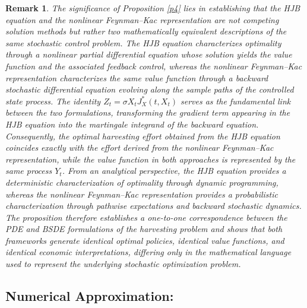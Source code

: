\documentclass[11pt]{article}
\newtheorem{remark}{\bf Remark}
\begin{document}
	\begin{remark}
		The significance of Proposition \ref{p4} lies in establishing that the HJB equation and the nonlinear Feynman--Kac representation are not competing solution methods but rather two mathematically equivalent descriptions of the same stochastic control problem. The HJB equation characterizes optimality through a nonlinear partial differential equation whose solution yields the value function and the associated feedback control, whereas the nonlinear Feynman--Kac representation characterizes the same value function through a backward stochastic differential equation evolving along the sample paths of the controlled state process. The identity $Z_t=\sigma X_tJ_X^*(t,X_t)$ serves as the fundamental link between the two formulations, transforming the gradient term appearing in the HJB equation into the martingale integrand of the backward equation. Consequently, the optimal harvesting effort obtained from the HJB equation coincides exactly with the effort derived from the nonlinear Feynman--Kac representation, while the value function in both approaches is represented by the same process $Y_t$. From an analytical perspective, the HJB equation provides a deterministic characterization of optimality through dynamic programming, whereas the nonlinear Feynman--Kac representation provides a probabilistic characterization through pathwise expectations and backward stochastic dynamics. The proposition therefore establishes a one-to-one correspondence between the PDE and BSDE formulations of the harvesting problem and shows that both frameworks generate identical optimal policies, identical value functions, and identical economic interpretations, differing only in the mathematical language used to represent the underlying stochastic optimization problem.
	\end{remark}
	
	\subsection{Numerical Approximation:}
	
\end{document}
